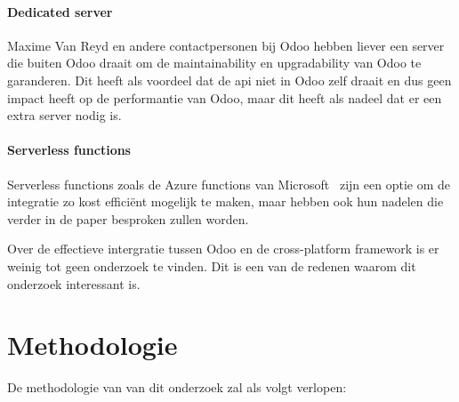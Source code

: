 \paragraph*{Dedicated server}
Maxime Van Reyd en andere contactpersonen bij Odoo hebben liever een server die buiten Odoo draait om de maintainability en upgradability van Odoo te garanderen.
Dit heeft als voordeel dat de api niet in Odoo zelf draait en dus geen impact heeft op de performantie van Odoo, maar dit heeft als nadeel dat er een extra server nodig is.

\paragraph*{Serverless functions}
Serverless functions zoals de Azure functions van Microsoft~\textcite{microsoftAzureFunctions} zijn een optie om de integratie zo kost efficiënt mogelijk te maken, 
maar hebben ook hun nadelen die verder in de paper besproken zullen worden.

\bigskip

Over de effectieve intergratie tussen Odoo en de cross-platform framework is er weinig tot geen onderzoek te vinden.
Dit is een van de redenen waarom dit onderzoek interessant is.

\section{Methodologie}%
\label{sec:methodologie}






De methodologie van van dit onderzoek zal als volgt verlopen:

